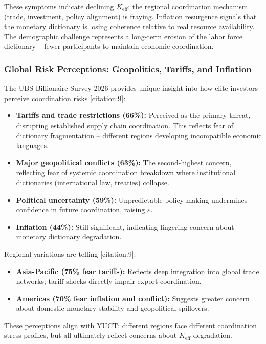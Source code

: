 \documentclass[11pt,a4paper]{article}
\theoremstyle{remark}
\begin{document}
	These symptoms indicate declining \(K_{\text{eff}}\): the regional coordination mechanism (trade, investment, policy alignment) is fraying. Inflation resurgence signals that the monetary dictionary is losing coherence relative to real resource availability. The demographic challenge represents a long-term erosion of the labor force dictionary – fewer participants to maintain economic coordination.
	
	\subsubsection{Global Risk Perceptions: Geopolitics, Tariffs, and Inflation}
	The UBS Billionaire Survey 2026 provides unique insight into how elite investors perceive coordination risks [citation:9]:
	\begin{itemize}
		\item \textbf{Tariffs and trade restrictions (66\%):} Perceived as the primary threat, disrupting established supply chain coordination. This reflects fear of dictionary fragmentation – different regions developing incompatible economic languages.
		\item \textbf{Major geopolitical conflicts (63\%):} The second-highest concern, reflecting fear of systemic coordination breakdown where institutional dictionaries (international law, treaties) collapse.
		\item \textbf{Political uncertainty (59\%):} Unpredictable policy-making undermines confidence in future coordination, raising \(\varepsilon\).
		\item \textbf{Inflation (44\%):} Still significant, indicating lingering concern about monetary dictionary degradation.
	\end{itemize}
	
	Regional variations are telling [citation:9]:
	\begin{itemize}
		\item \textbf{Asia-Pacific (75\% fear tariffs):} Reflects deep integration into global trade networks; tariff shocks directly impair export coordination.
		\item \textbf{Americas (70\% fear inflation and conflict):} Suggests greater concern about domestic monetary stability and geopolitical spillovers.
	\end{itemize}
	
	These perceptions align with YUCT: different regions face different coordination stress profiles, but all ultimately reflect concerns about \(K_{\text{eff}}\) degradation.
	
\end{document}
